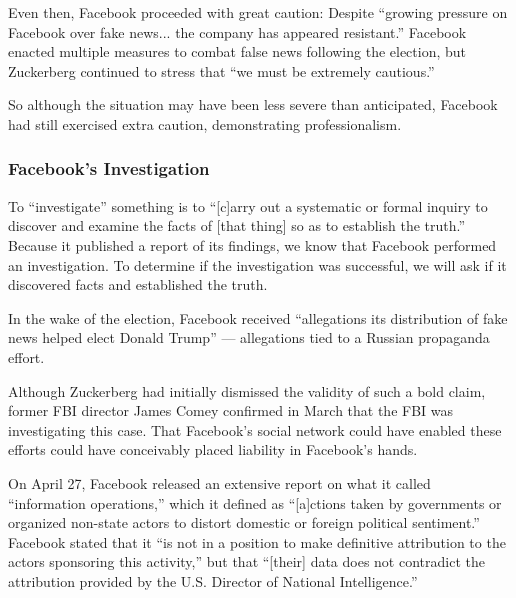 \par Even then, Facebook proceeded with great caution: Despite ``growing pressure on Facebook over fake news... the company has appeared resistant.'' \cite{guardian_steps} Facebook enacted multiple measures to combat false news following the election, \cite{tc_downranks} but Zuckerberg continued to stress that ``we must be extremely cautious.'' \cite{zuck_resp_a}

\par So although the situation may have been less severe than anticipated, Facebook had still exercised extra caution, demonstrating professionalism.

\subsubsection{Facebook's Investigation}

\par To ``investigate'' something is to ``[c]arry out a systematic or formal inquiry to discover and examine the facts of [that thing] so as to establish the truth.'' \cite{oxford} Because it published a report of its findings, we know that Facebook performed an investigation. \cite{fb_info_ops} To determine if the investigation was successful, we will ask if it discovered facts and established the truth.


\par In the wake of the election, Facebook received ``allegations its distribution of fake news helped elect Donald Trump'' \cite{tc_ai} --- allegations tied to a Russian propaganda effort. \cite{wp_russia} 

\par Although Zuckerberg had initially dismissed the validity of such a bold claim, \cite{zuck_resp_a} former FBI director James Comey confirmed in March that the FBI was investigating this case. \cite{comey} That Facebook's social network could have enabled these efforts could have conceivably placed liability in Facebook's hands.

\label{investigation}

\par On April 27, Facebook released an extensive report on what it called ``information operations,'' which it defined as ``[a]ctions taken by governments or organized non-state actors to distort domestic or foreign political sentiment.'' \cite{fb_info_ops} Facebook stated that it ``is not in a position to make definitive attribution to the actors sponsoring this activity,'' \cite{fb_info_ops} but that ``[their] data does not contradict the attribution provided by the U.S. Director of National Intelligence.'' \cite{fb_info_ops}

